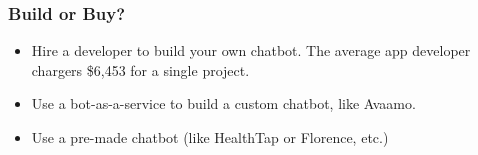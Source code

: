 \begin{frame}[fragile]\frametitle{Build or Buy?}

\begin{itemize}
\item Hire a developer to build your own chatbot. The average app developer chargers \$6,453 for a single project.
\item Use a bot-as-a-service to build a custom chatbot, like Avaamo.
\item Use a pre-made chatbot (like HealthTap or Florence, etc.)
\end{itemize}


\end{frame}